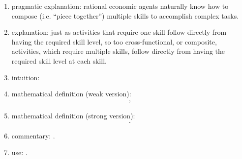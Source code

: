 \documentclass{elsarticle} %
\begin{document}
\begin{enumerate}
          \begin{enumerate}
            \item pragmatic explanation: rational economic agents naturally know how to compose (i.e. ``piece together'') multiple skills to accomplish complex tasks.
            \item explanation: just as activities that require one skill follow directly from having the required skill level, so too cross-functional, or composite, activities, which require multiple skills, follow directly from having the required skill level at each skill.
            \item intuition: 
              \item mathematical definition (weak version):
                    \begin{gather*}
                        ,
                    \end{gather*}
              \item mathematical definition (strong version):
                    \begin{gather*}
                        .
                    \end{gather*}
              \item commentary: .
              \item use: .
          \end{enumerate}
\end{enumerate}
\end{document}
